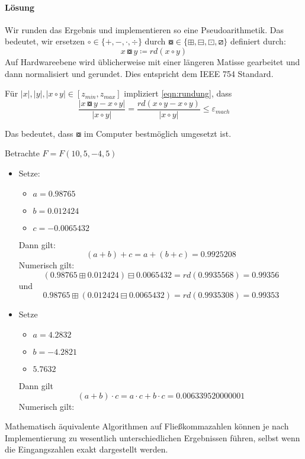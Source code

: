 \paragraph{Lösung}
Wir runden das Ergebnis und implementieren so eine Pseudoarithmetik.
Das bedeutet, wir ersetzen $\circ \in  \{+,-,\cdot, \div\}$ durch $\boxcircle \in \{\boxplus, \boxminus, \boxdot, \boxslash\}$ definiert durch:
\begin{equation}\label{eqn:rundung}
x \boxcircle y \coloneqq rd (x \circ y)
\end{equation}
Auf Hardwareebene wird üblicherweise mit einer längeren Matisse gearbeitet und dann normalisiert und gerundet. Dies entspricht dem IEEE 754 Standard.
\begin{remark}
Für $|x|,|y|, |x \circ y| \in [z_{min},z_{max}]$ impliziert \eqref{eqn:rundung}, dass
\[
	\frac{|x \boxcircle y - x \circ y|}{|x \circ y|}= \frac{rd(x \circ y - x \circ y)}{|x \circ y|} \le \varepsilon_{mach}
\]

Das bedeutet, dass $\boxcircle$ im Computer bestmöglich umgesetzt ist.
\end{remark}
\begin{example}
Betrachte $F=F(10,5,-4,5)$ \\
\begin{itemize}
	\item Setze:
\begin{itemize}
	\item $a=0.98765$
	\item $b=0.012424$
	\item $c=-0.0065432$
\end{itemize}
Dann gilt:
\[
	(a+b)+c=a+(b+c)=0.9925208
\]
Numerisch gilt:
\[
(0.98765 \boxplus 0.012424)\boxminus 0.0065432= rd(0.9935568)=0.99356
\]
und
\[
0.98765 \boxplus (0.012424\boxminus 0.0065432)=rd(0.9935308)=0.99353
\]
\item Setze
	\begin{itemize}
		\item $a=4.2832$
		\item $b=-4.2821$
		\item $5.7632$
	\end{itemize}
Dann gilt
\[
(a+b)\cdot c = a \cdot c + b \cdot c = 0.006339520000001
\]
Numerisch gilt:
\end{itemize}
\end{example}
\begin{remark}
Mathematisch äquivalente Algorithmen auf Fließkommazahlen können je nach Implementierung zu wesentlich unterschiedlichen Ergebnissen führen, selbst wenn die Eingangszahlen exakt dargestellt werden.
\end{remark}
